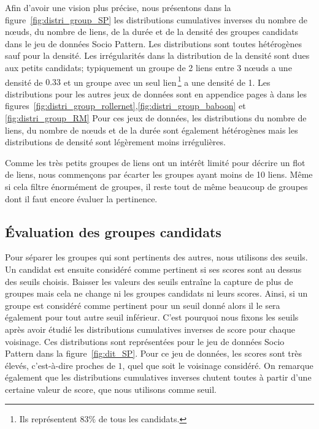 Afin d'avoir une vision plus précise, nous présentons dans la figure~\ref{fig:distri_group_SP} les distributions cumulatives inverses du nombre de n\oe{}uds, du nombre de liens, de la durée et de la densité des groupes candidats dans le jeu de données Socio Pattern.
Les distributions sont toutes hétérogènes sauf pour la densité.
Les irrégularités dans la distribution de la densité sont dues aux petits candidats; typiquement un groupe de 2 liens entre 3 n\oe{}uds a une densité de $0.33$ et un groupe avec un seul lien\,\footnote{Ils représentent $83\%$ de tous les candidats.} a une densité de 1.
Les distributions pour les autres jeux de données sont en appendice pages \pageref{fig:distri_group_rollernet} à \pageref{fig:distri_group_RM} dans les figures~\ref{fig:distri_group_rollernet},\ref{fig:distri_group_baboon} et \ref{fig:distri_group_RM}
Pour ces jeux de données, les distributions du nombre de liens, du nombre de n\oe{}uds et de la durée sont également hétérogènes mais les distributions de densité sont légèrement moins irrégulières.


Comme les très petits groupes de liens ont un intérêt limité pour décrire un flot de liens, nous commençons par écarter les groupes ayant moins de 10 liens.
Même si cela filtre énormément de groupes, il reste tout de même beaucoup de groupes dont il faut encore évaluer la pertinence.




\subsection{Évaluation des groupes candidats}

Pour séparer les groupes qui sont pertinents des autres, nous utilisons des seuils.
Un candidat est ensuite considéré comme pertinent si ses scores sont au dessus des seuils choisis.
Baisser les valeurs des seuils entraîne la capture de plus de groupes mais cela ne change ni les groupes candidats ni leurs scores.
Ainsi, si un groupe est considéré comme pertinent pour un seuil donné alors il le sera également pour tout autre seuil inférieur.
C'est pourquoi nous fixons les seuils après avoir étudié les distributions cumulatives inverses de score pour chaque voisinage.
Ces distributions sont représentées pour le jeu de données Socio Pattern dans la figure~\ref{fig:dit_SP}.
Pour ce jeu de données, les scores sont très élevés, c'est-à-dire proches de $1$, quel que soit le voisinage considéré.
On remarque également que les distributions cumulatives inverses chutent toutes à partir d'une certaine valeur de score, que nous utilisons comme seuil.

